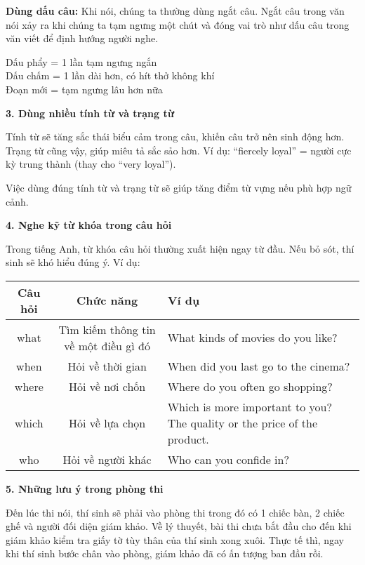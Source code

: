 \vspace{.25cm}
\textbf{Dùng dấu câu:}  
Khi nói, chúng ta thường dùng ngắt câu. Ngắt câu trong văn nói xảy ra khi chúng ta tạm ngưng một chút và đóng vai trò như dấu câu trong văn viết để định hướng người nghe.  

\vspace{.25cm}
\quad Dấu phẩy = 1 lần tạm ngưng ngắn \\
\quad Dấu chấm = 1 lần dài hơn, có hít thở không khí \\
\quad Đoạn mới = tạm ngưng lâu hơn nữa  

\bigskip
\textbf{3. Dùng nhiều tính từ và trạng từ}  

\vspace{.25cm}
Tính từ sẽ tăng sắc thái biểu cảm trong câu, khiến câu trở nên sinh động hơn. 
Trạng từ cũng vậy, giúp miêu tả sắc sảo hơn. Ví dụ:  
``fiercely loyal'' = người cực kỳ trung thành (thay cho ``very loyal'').  

Việc dùng đúng tính từ và trạng từ sẽ giúp tăng điểm từ vựng nếu phù hợp ngữ cảnh.  

\bigskip
\textbf{4. Nghe kỹ từ khóa trong câu hỏi}  

\vspace{.25cm}
Trong tiếng Anh, từ khóa câu hỏi thường xuất hiện ngay từ đầu. 
Nếu bỏ sót, thí sinh sẽ khó hiểu đúng ý. Ví dụ:  

\vspace{.25cm}

\begin{tabularx}{\textwidth}{|c|c|X|}
\hline
\textbf{Câu hỏi} & \textbf{Chức năng} & \textbf{Ví dụ} \\
\hline
what & Tìm kiếm thông tin về một điều gì đó & What kinds of movies do you like? \\
\hline
when & Hỏi về thời gian & When did you last go to the cinema? \\
\hline
where & Hỏi về nơi chốn & Where do you often go shopping? \\
\hline
which & Hỏi về lựa chọn & Which is more important to you? The quality or the price of the product. \\
\hline
who & Hỏi về người khác & Who can you confide in? \\
\hline
\end{tabularx}


\textbf{5. Những lưu ý trong phòng thi}  

\vspace{.25cm}
Đến lúc thi nói, thí sinh sẽ phải vào phòng thi trong đó có 1 chiếc bàn, 2 chiếc ghế và người đối diện giám khảo. 
Về lý thuyết, bài thi chưa bắt đầu cho đến khi giám khảo kiểm tra giấy tờ tùy thân của thí sinh xong xuôi. 
Thực tế thì, ngay khi thí sinh bước chân vào phòng, giám khảo đã có ấn tượng ban đầu rồi.  


